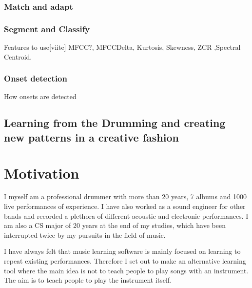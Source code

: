 \documentclass[10pt]{article}
\begin{document}
\subsubsection{Match and adapt }
\subsubsection{Segment and Classify}
Features to use[viite] MFCC?, MFCCDelta, Kurtosis, Skewness, ZCR ,Spectral Centroid.
\subsubsection{Onset detection}
How onsets are detected

\iffalse 
\subsection{Handling Distorted Input Signals}
On a possible portable gaming device the microphone quality is usually low for recording a high sound pressure instrument such as the drums. In order to get reasonable separation of different drums we have to detect and declip clipped audio signal parts of the input. 
$x_{c}[n]=\{\begin{array}{rcl} x[n]&\\x[n]\end{array}$ 
\subsubsection{IHT}
Iterative Hard Threshold
\fi
 \subsection{Learning from the Drumming and creating new patterns in a creative fashion}
 
 \section{Motivation}
I myself am a professional drummer with more than 20 years, 7 albums and 1000 live performances of experience. I have also worked as a sound engineer for other bands and recorded a plethora of different acoustic and electronic performances. I am also a CS major of 20 years at the end of my studies, which have been interrupted twice by my pursuits in the field of music.

I have always felt that music learning software is mainly focused on learning to repeat existing performances. Therefore I set out to make an alternative learning tool where the main idea is not to teach people to play songs with an instrument. The aim is to teach people to play the instrument itself.
\end{document}
